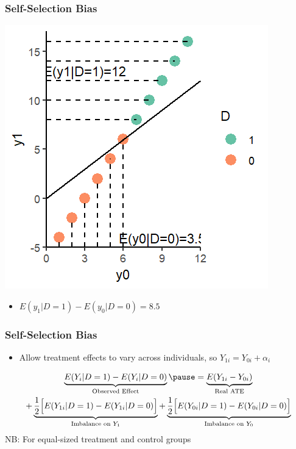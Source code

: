 \documentclass[xcolor=x11names,compress]{beamer}\usepackage[]{graphicx}\usepackage[]{color}
\makeatletter
\def\maxwidth{ %
  \ifdim\Gin@nat@width>\linewidth
    \linewidth
  \else
    \Gin@nat@width
  \fi
}
\newenvironment{knitrout}{}{} %
\renewcommand{\(}{\begin{columns}}
\renewcommand{\)}{\end{columns}}
\newcommand{\<}[1]{\begin{column}{#1}}
\renewcommand{\>}{\end{column}}
\makeatother
\begin{document}
\begin{frame}
\frametitle{Self-Selection Bias}
\begin{knitrout}
\color{fgcolor}
\includegraphics[width=\maxwidth]{figure/SSB3-1} 

\end{knitrout}
\begin{itemize}
\item $E(y_1|D=1)-E(y_0|D=0)=8.5$
\end{itemize}
\end{frame}

\begin{frame}
\frametitle{Self-Selection Bias}
\begin{itemize}
\item Allow treatment effects to vary across individuals, so $Y_{1i} = Y_{0i} + \alpha_i$
\end{itemize}
\pause
\begin{multline}
\underbrace{E(Y_i|D=1)-E(Y_i|D=0)}_\text{Observed Effect} \pause = \underbrace{E(Y_{1i} - Y_{0i})}_\text{Real ATE} \\ + \underbrace{\frac{1}{2}\Big[ E(Y_{1i}|D=1) - E(Y_{1i}|D=0) \Big]}_\text{Imbalance on $Y_1$} + \underbrace{\frac{1}{2}\Big[ E(Y_{0i}|D=1) - E(Y_{0i}|D=0) \Big]}_\text{Imbalance on $Y_0$}
\end{multline}
\footnotesize
NB: For equal-sized treatment and control groups
\normalsize
\end{frame}
\end{document}
